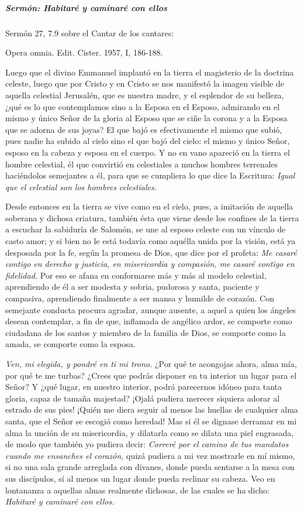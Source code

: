 \documentclass[]{article}
\let\oldsubparagraph\subparagraph
\renewcommand{\subparagraph}[1]{\oldsubparagraph{#1}\mbox{}}
\begin{document}
\subparagraph{Sermón: Habitaré y caminaré con
ellos}\label{sermuxf3n-habitaruxe9-y-caminaruxe9-con-ellos}

Sermón 27, 7.9 sobre el Cantar de los cantares:

Opera omnia. Edit. Cister. 1957, I, 186-188.

Luego que el divino Emmanuel implantó en la tierra el magisterio de la
doctrina celeste, luego que por Cristo y en Cristo se nos manifestó la
imagen visible de aquella celestial Jerusalén, que es nuestra madre, y
el esplendor de su belleza, ¿qué es lo que contemplamos sino a la Esposa
en el Esposo, admirando en el mismo y único Señor de la gloria al Esposo
que se ciñe la corona y a la Esposa que se adorna de sus joyas? El que
bajó es efectivamente el mismo que subió, pues nadie ha subido al cielo
sino el que bajó del cielo: el mismo y único Señor, esposo en la cabeza
y esposa en el cuerpo. Y no en vano apareció en la tierra el hombre
celestial, él que convirtió en celestiales a muchos hombres terrenales
haciéndolos semejantes a él, para que se cumpliera lo que dice la
Escritura: \emph{Igual que el celestial son los hombres celestiales.}

Desde entonces en la tierra se vive como en el cielo, pues, a imitación
de aquella soberana y dichosa criatura, también ésta que viene desde los
confines de la tierra a escuchar la sabiduría de Salomón, se une al
esposo celeste con un vínculo de casto amor; y si bien no le está
todavía como aquélla unida por la visión, está ya desposada por la fe,
según la promesa de Dios, que dice por el profeta: \emph{Me casaré
contigo en derecho y justicia, en misericordia y compasión, me casaré
contigo en fidelidad.} Por eso se afana en conformarse más y más al
modelo celestial, aprendiendo de él a ser modesta y sobria, pudorosa y
santa, paciente y compasiva, aprendiendo finalmente a ser mansa y
humilde de corazón. Con semejante conducta procura agradar, aunque
ausente, a aquel a quien los ángeles desean contemplar, a fin de que,
inflamada de angélico ardor, se comporte como ciudadana de los santos y
miembro de la familia de Dios, se comporte como la amada, se comporte
como la esposa.

\emph{Ven, mi elegida, y pondré en ti mi trono.} ¿Por qué te acongojas
ahora, alma mía, por qué te me turbas? ¿Crees que podrás disponer en tu
interior un lugar para el Señor? Y ¿qué lugar, en nuestro interior,
podrá parecernos idóneo para tanta gloria, capaz de tamaña majestad?
¡Ojalá pudiera merecer siquiera adorar al estrado de sus pies! ¡Quién me
diera seguir al menos las huellas de cualquier alma santa, que el Señor
se escogió como heredad! Mas si él se dignase derramar en mi alma la
unción de su misericordia, y dilatarla como se dilata una piel
engrasada, de modo que también yo pudiera decir: \emph{Correré por el
camino de tus mandatos cuando me ensanches el corazón,} quizá pudiera a
mi vez mostrarle en mí mismo, si no una sala grande arreglada con
divanes, donde pueda sentarse a la mesa con sus discípulos, sí al menos
un lugar donde pueda reclinar su cabeza. Veo en lontananza a aquellas
almas realmente dichosas, de las cuales se ha dicho: \emph{Habitaré y
caminaré con
ellos.}
\end{document}
